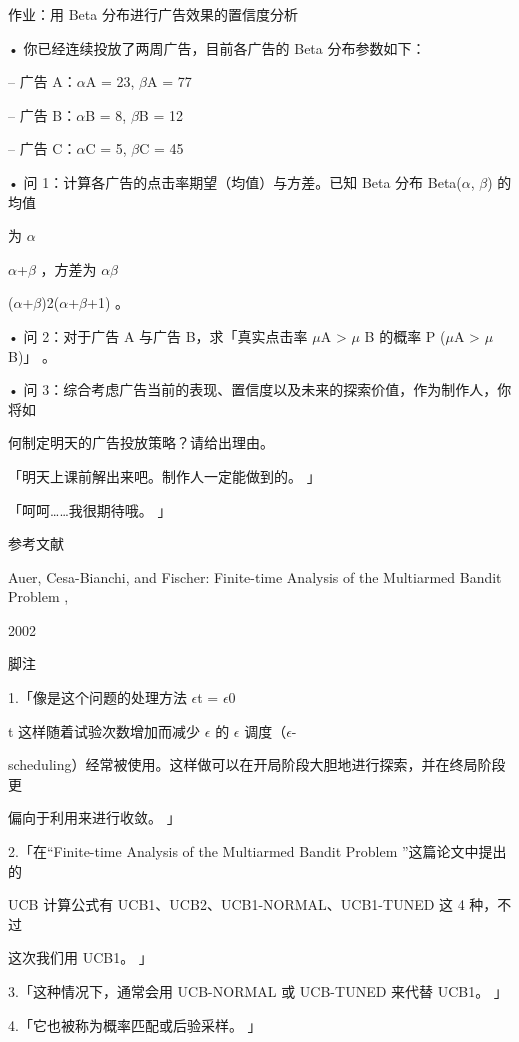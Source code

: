 作业：用 Beta 分布进行广告效果的置信度分析\par
• 你已经连续投放了两周广告，目前各广告的 Beta 分布参数如下：\par
– 广告 A：$\alpha$A = 23, $\beta$A = 77\par
– 广告 B：$\alpha$B = 8, $\beta$B = 12\par
– 广告 C：$\alpha$C = 5, $\beta$C = 45\par
• 问 1：计算各广告的点击率期望（均值）与方差。已知 Beta 分布 Beta($\alpha$, $\beta$) 的均值\par
为 $\alpha$\par
$\alpha$+$\beta$ ，方差为 $\alpha$$\beta$\par
($\alpha$+$\beta$)2($\alpha$+$\beta$+1) 。\par
• 问 2：对于广告 A 与广告 B，求「真实点击率 $\mu$A > $\mu$ B 的概率 P ($\mu$A > $\mu$ B)」 。\par
• 问 3：综合考虑广告当前的表现、置信度以及未来的探索价值，作为制作人，你将如\par
何制定明天的广告投放策略？请给出理由。\par
「明天上课前解出来吧。制作人一定能做到的。 」\par
「呵呵……我很期待哦。 」\par
参考文献\par
Auer, Cesa-Bianchi, and Fischer: Finite-time Analysis of the Multiarmed Bandit Problem ,\par
2002\par
脚注\par
1.「像是这个问题的处理方法 $\epsilon$t = $\epsilon$0\par
t 这样随着试验次数增加而减少 $\epsilon$ 的 $\epsilon$ 调度（$\epsilon$-\par
scheduling）经常被使用。这样做可以在开局阶段大胆地进行探索，并在终局阶段更\par
偏向于利用来进行收敛。 」\par
2.「在“Finite-time Analysis of the Multiarmed Bandit Problem ”这篇论文中提出的\par
UCB 计算公式有 UCB1、UCB2、UCB1-NORMAL、UCB1-TUNED 这 4 种，不过\par
这次我们用 UCB1。 」\par
3.「这种情况下，通常会用 UCB-NORMAL 或 UCB-TUNED 来代替 UCB1。 」\par
4.「它也被称为概率匹配或后验采样。 」\par

